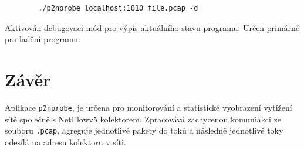\documentclass[11pt, a4paper, hidelinks]{article}[08.10.2023]
\begin{document}
    \begin{lstlisting}
        ./p2nprobe localhost:1010 file.pcap -d
    \end{lstlisting}
    Aktivován debugovací mód pro výpis aktuálního stavu programu. Určen primárně pro ladění programu.

    \section{Závěr}
    Aplikace \texttt{p2nprobe}, je určena pro monitorování a statistické vyobrazení vytížení sítě společně s NetFlowv5 kolektorem. Zpracovává zachycenou komuniakci ze souboru \texttt{.pcap}, agreguje jednotlivé pakety do toků a následně jednotlivé toky odesílá na adresu kolektoru v síti.


    \pagebreak

    
    
\end{document}
